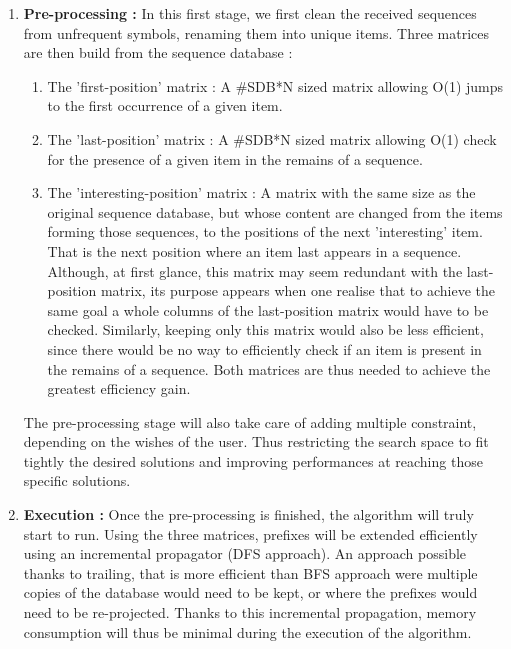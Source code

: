 \documentclass{eplmastersthesis}
\begin{document}
\begin{enumerate}
\item \textbf{Pre-processing :} In this first stage, we first clean the received sequences from unfrequent symbols, renaming them into unique items. Three matrices are then build from the sequence database :
	\begin{enumerate}
		\item The 'first-position' matrix : A \#SDB*N sized matrix allowing O(1) jumps to the first occurrence of a given item. 
		\item The 'last-position' matrix : A  \#SDB*N sized matrix allowing O(1) check for the presence of a given item in the remains of a sequence.
		\item The 'interesting-position' matrix : A matrix with the same size as the original sequence database, but whose content are changed from the items forming those sequences, to the positions of the next 'interesting' item. That is the next position where an item last appears in a sequence. \\ Although, at first glance, this matrix may seem redundant with the last-position matrix, its purpose appears when one realise that to achieve the same goal a whole columns of the last-position matrix would have to be checked. Similarly, keeping only this matrix would also be less efficient, since there would be no way to efficiently check if an item is present in the remains of a sequence. Both matrices are thus needed to achieve the greatest efficiency gain. 
	\end{enumerate}
	
	The pre-processing stage will also take care of adding multiple constraint, depending on the wishes of the user. Thus restricting the search space to fit tightly the desired solutions and improving performances at reaching those specific solutions.
	
\item \textbf{Execution :} Once the pre-processing is finished, the algorithm will truly start to run. Using the three matrices, prefixes will be extended efficiently using an incremental propagator (DFS approach). An approach possible thanks to trailing, that is more efficient than BFS approach were multiple copies of the database would need to be kept, or where the prefixes would need to be re-projected. Thanks to this incremental propagation, memory consumption will thus be minimal during the execution of the algorithm. \newline


\end{enumerate}
\end{document}

